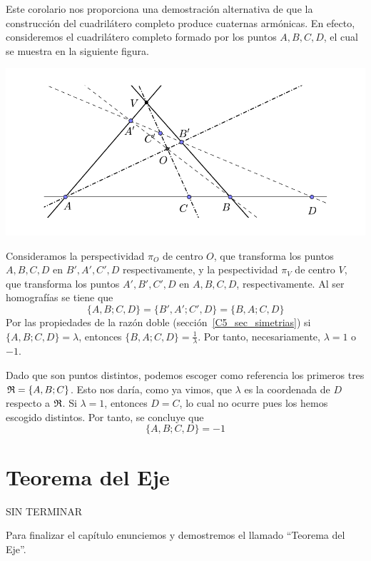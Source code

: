 \begin{obs}
	Este corolario nos proporciona una demostración alternativa de que la construcción del cuadrilátero completo produce cuaternas armónicas. En efecto, consideremos el cuadrilátero completo formado por los puntos $A,B,C,D$, el cual se muestra en la siguiente figura. 
	\begin{center}
		\includegraphics[scale=.9]{Graficos/Desargues/cuadrilatero}
	\end{center}
	Consideramos la perspectividad $\pi_O$ de centro $O$, que transforma los puntos $A,B,C,D$ en $B',A',C',D$ respectivamente, y la pespectividad $\pi_V$ de centro $V$, que transforma los puntos $A',B',C',D$ en $A,B,C,D$, respectivamente. Al ser homografías se tiene que
	\[\{A,B;C,D\}=\{B',A';C',D\}=\{B,A;C,D\}\]
	Por las propiedades de la razón doble (sección~\ref{C5_sec_simetrias}) si $\{A,B;C,D\}=\lambda$, entonces $\{B,A;C,D\}=\frac{1}{\lambda}$. Por tanto, necesariamente, $\lambda=1$ o $-1$.
	
	Dado que son puntos distintos, podemos escoger como referencia los primeros tres $\mathfrak{R}=\{A,B;C\}$. Esto nos daría, como ya vimos, que $\lambda$ es la coordenada de $D$ respecto a $\mathfrak{R}$. Si $\lambda=1$, entonces $D=C$, lo cual no ocurre pues los hemos escogido distintos. Por tanto, se concluye que 
	\[\{A,B;C,D\}=-1\]
\end{obs}
\section{Teorema del Eje}
\label{C7_Eje}
SIN TERMINAR

Para finalizar el capítulo enunciemos y demostremos el llamado ``Teorema del Eje''.

